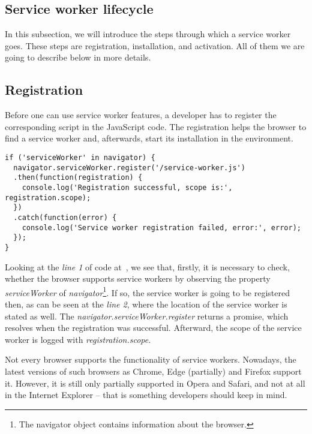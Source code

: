 \subsection{Service worker lifecycle}

In this subsection, we will introduce the steps through which a service worker goes. These steps are registration, installation, and activation. All of them we are going to describe below in more details.

\subsection*{Registration}

Before one can use service worker features, a developer has to register the corresponding script in the JavaScript code. The registration helps the browser to find a service worker and, afterwards, start its installation in the environment.

\begin{lstlisting}[caption={[Code for a Service Worker registration]Code, which demonstrates how to register a service worker\cite{32}.}, label={lst:tech1}]
if ('serviceWorker' in navigator) {
  navigator.serviceWorker.register('/service-worker.js')
  .then(function(registration) {
    console.log('Registration successful, scope is:', registration.scope);
  })
  .catch(function(error) {
    console.log('Service worker registration failed, error:', error);
  });
}
\end{lstlisting}

Looking at the \textit{line 1} of code at~, we see that, firstly, it is necessary to check, whether the browser supports service workers by observing the property \textit{serviceWorker} of \textit{navigator}\footnote{The navigator object contains information about the browser\cite{43}.}. If so, the service worker is going to be registered then, as can be seen at the \textit{line 2}, where the location of the service worker is stated as well. The \textit{navigator.serviceWorker.register} returns a promise, which resolves when the registration was successful. Afterward, the scope of the service worker is logged with \textit{registration.scope}. 

Not every browser supports the functionality of service workers. Nowadays, the latest versions of such browsers as Chrome, Edge (partially) and Firefox support it. However, it is still only partially supported in Opera and Safari, and not at all in the Internet Explorer\cite{42} -- that is something developers should keep in mind.

